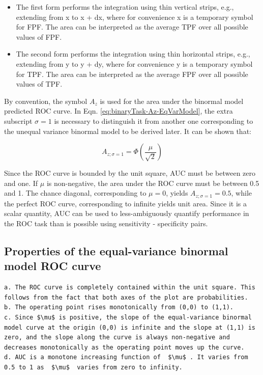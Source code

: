 \documentclass[
]{book}
\providecommand{\tightlist}{%
  \setlength{\itemsep}{0pt}\setlength{\parskip}{0pt}}
\begin{document}
\begin{itemize}
\tightlist
\item
  The first form performs the integration using thin vertical strips, e.g., extending from x to x + dx, where for convenience x is a temporary symbol for FPF. The area can be interpreted as the average TPF over all possible values of FPF.
\item
  The second form performs the integration using thin horizontal strips, e.g., extending from y to y + dy, where for convenience y is a temporary symbol for TPF. The area can be interpreted as the average FPF over all possible values of TPF.
\end{itemize}

By convention, the symbol \(A_z\) is used for the area under the binormal model predicted ROC curve. In Eqn. \eqref{eq:binaryTask-Az-EqVarModel}, the extra subscript \(\sigma = 1\) is necessary to distinguish it from another one corresponding to the unequal variance binormal model to be derived later. It can be shown that:

\begin{equation} 
A_{z;\sigma = 1} = \Phi\left ( \frac{\mu} {\sqrt{2}} \right )
\label{eq:binaryTask-Az-EqVarModel2}
\end{equation}

Since the ROC curve is bounded by the unit square, AUC must be between zero and one. If \(\mu\) is non-negative, the area under the ROC curve must be between 0.5 and 1. The chance diagonal, corresponding to \(\mu = 0\), yields \(A_{z;\sigma = 1} = 0.5\), while the perfect ROC curve, corresponding to infinite yields unit area. Since it is a scalar quantity, AUC can be used to less-ambiguously quantify performance in the ROC task than is possible using sensitivity - specificity pairs.

\hypertarget{properties-of-the-equal-variance-binormal-model-roc-curve}{%
\subsection{Properties of the equal-variance binormal model ROC curve}\label{properties-of-the-equal-variance-binormal-model-roc-curve}}

\begin{verbatim}
a. The ROC curve is completely contained within the unit square. This follows from the fact that both axes of the plot are probabilities.
b. The operating point rises monotonically from (0,0) to (1,1). 
c. Since $\mu$ is positive, the slope of the equal-variance binormal model curve at the origin (0,0) is infinite and the slope at (1,1) is zero, and the slope along the curve is always non-negative and decreases monotonically as the operating point moves up the curve.
d. AUC is a monotone increasing function of  $\mu$ . It varies from 0.5 to 1 as  $\mu$  varies from zero to infinity. 
\end{verbatim}
\end{document}
